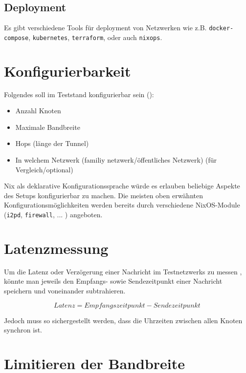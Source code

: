 \subsection{Deployment}


Es gibt verschiedene Tools für deployment von Netzwerken wie z.B. \lstinline|docker-compose|, \lstinline|kubernetes|, \lstinline|terraform|, oder auch \lstinline|nixops|.


\section{Konfigurierbarkeit}

Folgendes soll im Teststand konfigurierbar sein ():

\begin{itemize}
    \item Anzahl Knoten
    \item Maximale Bandbreite
    \item Hops (länge der Tunnel)
    \item In welchem Netzwerk (familiy netzwerk/öffentliches Netzwerk) (für Vergleich/optional)
\end{itemize}

Nix als deklarative Konfigurationssprache würde es erlauben beliebige Aspekte des Setups konfigurierbar zu machen.
Die meisten oben erwähnten Konfigurationsmöglichkeiten werden bereits durch verschiedene NixOS-Module (\lstinline|i2pd|, \lstinline|firewall|, ... ) angeboten.

\section{Latenzmessung}

Um die Latenz oder Verzögerung einer Nachricht im Testnetzwerks zu messen , könnte man jeweils den Empfangs- sowie Sendezeitpunkt einer Nachricht speichern und voneinander subtrahieren.

\begin{equation}
    Latenz = Empfangszeitpunkt - Sendezeitpunkt
\end{equation}

Jedoch muss so sichergestellt werden, dass die Uhrzeiten zwischen allen Knoten synchron ist.


\section{Limitieren der Bandbreite}

